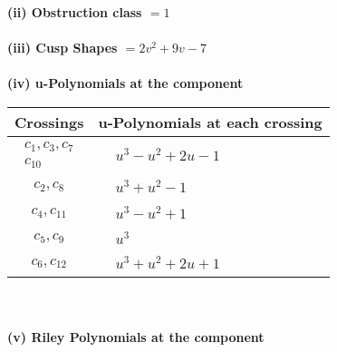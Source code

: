 \documentclass[1p]{elsarticle_modified}
\theoremstyle{definition}
\begin{document}
\flushleft \textbf{(ii) Obstruction class $= 1$}\\~\\
\flushleft \textbf{(iii) Cusp Shapes $= 2 v^2+9 v-7$}\\~\\
\newpage\renewcommand{\arraystretch}{1}
\flushleft \textbf{(iv) u-Polynomials at the component}\newline \\
\begin{tabular}{m{50pt}|m{274pt}}
Crossings & \hspace{64pt}u-Polynomials at each crossing \\
\hline $$\begin{aligned}c_{1},c_{3},c_{7}\\c_{10}\end{aligned}$$&$\begin{aligned}
&u^3- u^2+2 u-1
\end{aligned}$\\
\hline $$\begin{aligned}c_{2},c_{8}\end{aligned}$$&$\begin{aligned}
&u^3+u^2-1
\end{aligned}$\\
\hline $$\begin{aligned}c_{4},c_{11}\end{aligned}$$&$\begin{aligned}
&u^3- u^2+1
\end{aligned}$\\
\hline $$\begin{aligned}c_{5},c_{9}\end{aligned}$$&$\begin{aligned}
&u^3
\end{aligned}$\\
\hline $$\begin{aligned}c_{6},c_{12}\end{aligned}$$&$\begin{aligned}
&u^3+u^2+2 u+1
\end{aligned}$\\
\hline
\end{tabular}\\~\\
\newpage\renewcommand{\arraystretch}{1}
\flushleft \textbf{(v) Riley Polynomials at the component}\newline \\
\end{document}
